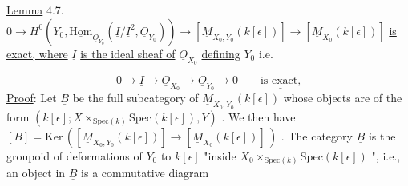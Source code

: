 \underline{Lemma} 4.7.  $0 \to H^{0}(Y_{0}, \underline{\mathrm{Hom}}_{\underline{O}_{Y_{0}}} (\underline{I}/\underline{I}^{2}, \underline{O}_{Y_{0}})) \to [\underline{M}_{X_{0},Y_{0}}(k[\epsilon])] \to [\underline{M}_{X_{0}}(k[\epsilon])]$ \underline{is exact, where}  $\underline{I}$  \underline{is the ideal sheaf of}  $\underline{O}_{X_{0}}$  \underline{defining}  $Y_{0}$  i.e. 



\begin{equation*}
 0 \to \underline{I} \to \underline{O}_{X_0} \to \underline{O}_{Y_0} \to 0 \qquad \underline{\text{is exact,}}
\end{equation*}
\underline{Proof}: Let $\underline{B}$ be the full subcategory of $\underline{M}_{X_0,Y_0}(k[\epsilon])$ whose objects are of the form $(k[\epsilon]; X \times_{\mathrm{Spec}(k)} \mathrm{Spec}(k[\epsilon]), Y)$ . We then have $[B] = \mathrm{Ker}\,([\underline{M}_{X_0,Y_0}(k[\epsilon])] \to [\underline{M}_{X_0}(k[\epsilon])]\,)$ . The category $\underline{B}$ is the groupoid of deformations of $Y_0$ to $k[\epsilon]$ "inside $X_0 \times_{\mathrm{Spec}(k)} \mathrm{Spec}(k[\epsilon])$ ", i.e., an object in $\underline{B}$ is a commutative diagram

